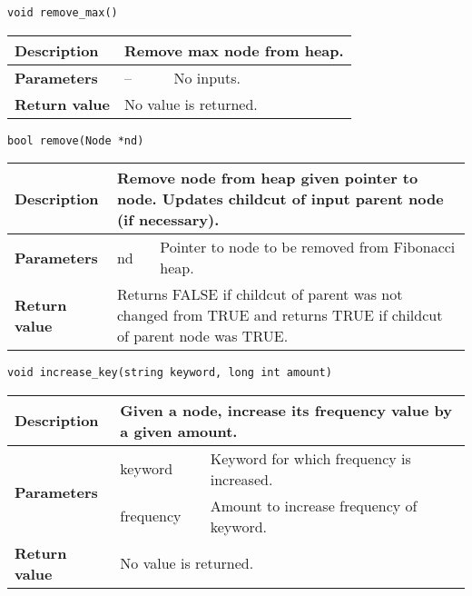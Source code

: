 \documentclass[12pt, reqno]{amsart}
\begin{document}
{\large \texttt{void remove\_max()}}
\begin{center}
    \begin{tabular}{| l | p{2.5cm} | p{9.5cm} |}
    \hline
    {\bfseries Description} & \multicolumn{2}{p{12.5cm}|}{Remove max node from heap.} \\ \hline
    \multirow{1}{*}{\bfseries Parameters} & -- & No inputs. \\ \hline
    {\bfseries Return value} & \multicolumn{2}{p{12.5cm}|}{No value is returned.} \\ \hline
    \end{tabular}
\end{center}

{\large \texttt{bool remove(Node *nd)}}
\begin{center}
    \begin{tabular}{| l | p{2.5cm} | p{9.5cm} |}
    \hline
    {\bfseries Description} & \multicolumn{2}{p{12.5cm}|}{Remove node from heap given pointer to node. Updates childcut of input parent node (if necessary).} \\ \hline
    \multirow{1}{*}{\bfseries Parameters} & nd & Pointer to node to be removed from Fibonacci heap. \\ \hline
    {\bfseries Return value} & \multicolumn{2}{p{12.5cm}|}{Returns FALSE if childcut of parent was not changed from TRUE and returns TRUE if childcut of parent node was TRUE.} \\ \hline
    \end{tabular}
\end{center}
    
{\large \texttt{void increase\_key(string keyword, long int amount)}}
\begin{center}
    \begin{tabular}{| l | p{2.5cm} | p{9.5cm} |}
    \hline
    {\bfseries Description} & \multicolumn{2}{p{12.5cm}|}{Given a node, increase its frequency value by a given amount.} \\ \hline
    \multirow{2}{*}{\bfseries Parameters} & keyword & Keyword for which frequency is increased. \\ \cline{2-3}
    & frequency & Amount to increase frequency of keyword. \\ \hline
    {\bfseries Return value} & \multicolumn{2}{p{12.5cm}|}{No value is returned.} \\ \hline
    \end{tabular}
\end{center}
\end{document}

